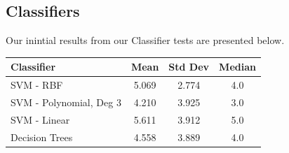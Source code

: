 \documentclass{article}
\begin{document}
\subsection{Classifiers}
Our inintial results from our Classifier tests are presented below. 

\begin{center}
\begin{tabular}{l|c|c|c}
Classifier & Mean & Std Dev & Median\\
\hline
SVM - RBF & 5.069 & 2.774 & 4.0 \\
SVM - Polynomial, Deg 3 & 4.210 & 3.925 & 3.0 \\
SVM - Linear & 5.611 & 3.912 & 5.0 \\
Decision Trees & 4.558 & 3.889 & 4.0
\end{tabular}
\end{center}
\end{document}
